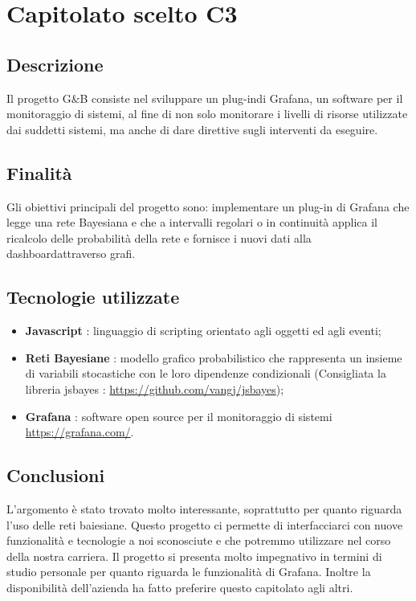 \section{Capitolato scelto C3}
	\subsection{Descrizione}
		Il progetto G\&B consiste nel sviluppare un plug-in\pedice di Grafana\pedice, un software per il monitoraggio di sistemi, al fine di non solo monitorare i livelli di risorse utilizzate dai suddetti sistemi, ma anche di dare direttive sugli interventi da eseguire.
	\subsection{Finalità}
		Gli obiettivi principali del progetto sono: implementare un plug-in di Grafana che legge una rete Bayesiana e che a intervalli regolari o in continuità applica il ricalcolo delle probabilità della rete e fornisce i nuovi dati alla dashboard\pedice attraverso grafi.
	\subsection{Tecnologie utilizzate}
		\begin{itemize}
			\item \textbf{Javascript\pedice} : linguaggio di scripting orientato agli oggetti ed agli eventi;
			\item \textbf{Reti Bayesiane\pedice} : modello grafico probabilistico che rappresenta un insieme di variabili stocastiche con le loro dipendenze condizionali (Consigliata la libreria jsbayes : \url{https://github.com/vangj/jsbayes});
			\item \textbf{Grafana} : software open source per il monitoraggio di sistemi \url{https://grafana.com/}.
		\end{itemize}
	\subsection{Conclusioni}
		L'argomento è stato trovato molto interessante, soprattutto per quanto riguarda l'uso delle reti baiesiane. Questo progetto ci permette di interfacciarci con nuove funzionalità e tecnologie a noi sconosciute e che potremmo utilizzare nel corso della nostra carriera.
		Il progetto si presenta molto impegnativo in termini di studio personale per quanto riguarda le funzionalità di Grafana.
		Inoltre la disponibilità dell'azienda ha fatto preferire questo capitolato agli altri.